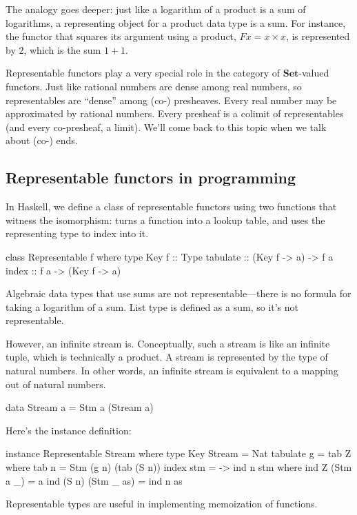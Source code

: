 \documentclass[DaoFP]{subfiles}
\begin{document}
The analogy goes deeper: just like a logarithm of a product is a sum of logarithms, a representing object for a product data type is a sum. For instance, the functor that squares its argument using a product, $F x = x \times x$, is represented by $2$, which is the sum $1 + 1$. 

Representable functors play a very special role in the category of $ \mathbf{Set}$-valued functors. Just like rational numbers are dense among real numbers, so representables are ``dense'' among (co-) presheaves. Every real number may be approximated by rational numbers. Every presheaf is a colimit of representables (and every co-presheaf, a limit). We'll come back to this topic when we talk about (co-) ends.

\subsection{Representable functors in programming}

In Haskell, we define a class of representable functors using two functions that witness the isomorphism:  turns a function into a lookup table, and  uses the representing type  to index into it.

\begin{haskell}
class Representable f where
  type Key f :: Type
  tabulate :: (Key f -> a) -> f a
  index    :: f a -> (Key f -> a)
\end{haskell}

Algebraic data types that use sums are not representable---there is no formula for taking a logarithm of a sum. List type is defined as a sum, so it's not representable. 

However, an infinite stream is. Conceptually, such a stream is like an infinite tuple, which is technically a product. A stream is represented by the type of natural numbers. In other words, an infinite stream is equivalent to a mapping out of natural numbers. 
\begin{haskell}
data Stream a = Stm a (Stream a)
\end{haskell}
Here's the instance definition:
\begin{haskell}
instance Representable Stream where
  type Key Stream = Nat
  tabulate g = tab Z
    where
      tab n = Stm (g n) (tab (S n))
  index stm = \n -> ind n stm
    where
      ind Z (Stm a _) = a
      ind (S n) (Stm _ as) = ind n as
\end{haskell}
Representable types are useful in implementing memoization of functions.
\end{document}

